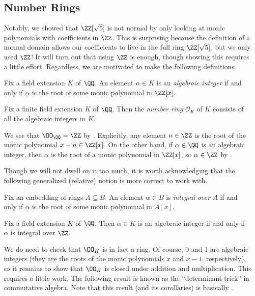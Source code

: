\documentclass[../notes.tex]{subfiles}
\begin{document}
\subsection{Number Rings}
Notably, we showed that $\ZZ[\sqrt5]$ is not normal by only looking at monic polynomials with coefficients in $\ZZ$. This is surprising because the definition of a normal domain allows our coefficients to live in the full ring $\ZZ[\sqrt5]$, but we only used $\ZZ$! It will turn out that using $\ZZ$ is enough, though showing this requires a little effort. Regardless, we are motivated to make the following definitions.
\begin{definition}
	Fix a field extension $K$ of $\QQ$. An element $\alpha\in K$ is an \textit{algebraic integer} if and only if $\alpha$ is the root of some monic polynomial in $\ZZ[x]$.
\end{definition}
\begin{definition}
	Fix a finite field extension $K$ of $\QQ$. Then the \textit{number ring} $\mathcal O_K$ of $K$ consists of all the algebraic integers in $K$.
\end{definition}
\begin{example} \label{ex:o-q-is-z}
	We see that $\OO_\QQ=\ZZ$ by . Explicitly, any element $n\in\ZZ$ is the root of the monic polynomial $x-n\in\ZZ[x]$. On the other hand, if $\alpha\in\QQ$ is an algebraic integer, then $\alpha$ is the root of a monic polynomial in $\ZZ[x]$, so $\alpha\in\ZZ$ by .
\end{example}
Though we will not dwell on it too much, it is worth acknowledging that the following generalized (relative) notion is more correct to work with.
\begin{definition}[integral]
	Fix an embedding of rings $A\subseteq B$. An element $\alpha\in B$ is \textit{integral over $A$} if and only if $\alpha$ is the root of some monic polynomial in $A[x]$.
\end{definition}
\begin{example}
	Fix a field extension $K$ of $\QQ$. Then $\alpha\in K$ is an algebraic integer if and only if $\alpha$ is integral over $\ZZ$.
\end{example}
We do need to check that $\OO_K$ is in fact a ring. Of course, $0$ and $1$ are algebraic integers (they are the roots of the monic polynomials $x$ and $x-1$, respectively), so it remains to show that $\OO_K$ is closed under addition and multiplication. This requires a little work. The following result is known as the ``determinant trick'' in commutative algebra. Note that this result (and its corollaries) is basically .
\end{document}

